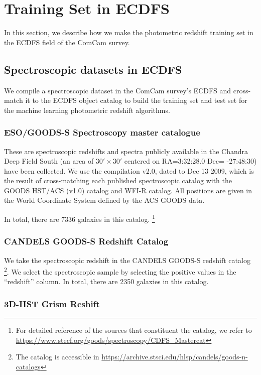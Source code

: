 


\section{Training Set in ECDFS}

In this section, we describe how we make the photometric redshift training set in the ECDFS field of the ComCam survey. 

\subsection{Spectroscopic datasets in ECDFS}

We compile a spectroscopic dataset in the ComCam survey's ECDFS and cross-match it to the ECDFS object catalog to build the training set and test set for the machine learning photometric redshift algorithms. 

\subsubsection{ESO/GOODS-S Spectroscopy master catalogue}

These are spectroscopic redshifts and spectra publicly available in the Chandra Deep Field South (an area of $30'\times30'$ centered on RA=3:32:28.0 Dec= -27:48:30) have been collected. We use the compilation v2.0, dated to Dec 13 2009, which is the result of cross-matching each published spectroscopic catalog with the GOODS HST/ACS (v1.0) catalog and WFI-R catalog. All positions are given in the World Coordinate System defined by the ACS GOODS data. 

In total, there are 7336 galaxies in this catalog. \footnote{For detailed reference of the sources that constituent the catalog, we refer to \url{https://www.stecf.org/goods/spectroscopy/CDFS\_Mastercat}}

\subsubsection{CANDELS GOODS-S Redshift Catalog}

We take the spectroscopic redshift in the CANDELS GOODS-S redshift catalog \footnote{The catalog is accessible in \url{https://archive.stsci.edu/hlsp/candels/goods-n-catalogs}}. We select the spectroscopic sample by selecting the positive values in the ``redshift'' column. In total, there are 2350 galaxies in this catalog. 

\subsubsection{3D-HST Grism Reshift}


